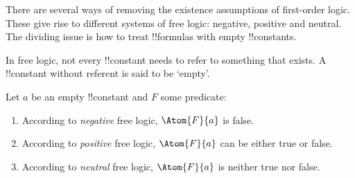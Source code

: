 \documentclass[../../../include/open-logic-section]{subfiles}
\begin{document}


There are several ways of removing the existence assumptions of
first-order logic. These give rise to different systems of free logic:
negative, positive and neutral. The dividing issue is how to treat 
!!{formula}s with empty !!{constant}s.

\begin{explain}
In free logic, not every !!{constant} needs to refer to something that exists.
A !!{constant} without referent is said to be `empty'. 
\end{explain}

Let $a$ be an empty !!{constant} and $F$ some predicate:

\begin{enumerate}
  \item According to \emph{negative} free logic, $\Atom{F}{a}$ is false.
  \item According to \emph{positive} free logic, $\Atom{F}{a}$ can be either
  true or false.
  \item According to \emph{neutral} free logic, $\Atom{F}{a}$ is neither
  true nor false.
\end{enumerate}
\end{document}
